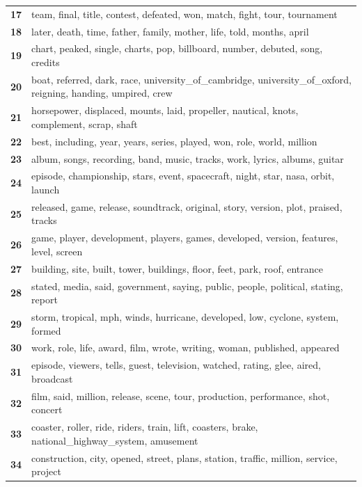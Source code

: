 \begin{table}[htpb]
\begin{tabularx}{\textwidth}{@{}l X@{}}
        \textbf{17} & team, final, title, contest, defeated, won, match, fight, tour, tournament \\
        \textbf{18} & later, death, time, father, family, mother, life, told, months, april \\
        \textbf{19} & chart, peaked, single, charts, pop, billboard, number, debuted, song, credits \\
        \textbf{20} & boat, referred, dark, race, university\_of\_cambridge, university\_of\_oxford, reigning, handing, umpired, crew \\
        \textbf{21} & horsepower, displaced, mounts, laid, propeller, nautical, knots, complement, scrap, shaft \\
        \textbf{22} & best, including, year, years, series, played, won, role, world, million \\
        \textbf{23} & album, songs, recording, band, music, tracks, work, lyrics, albums, guitar \\
        \textbf{24} & episode, championship, stars, event, spacecraft, night, star, nasa, orbit, launch \\
        \textbf{25} & released, game, release, soundtrack, original, story, version, plot, praised, tracks \\
        \textbf{26} & game, player, development, players, games, developed, version, features, level, screen \\
        \textbf{27} & building, site, built, tower, buildings, floor, feet, park, roof, entrance \\
        \textbf{28} & stated, media, said, government, saying, public, people, political, stating, report \\
        \textbf{29} & storm, tropical, mph, winds, hurricane, developed, low, cyclone, system, formed \\
        \textbf{30} & work, role, life, award, film, wrote, writing, woman, published, appeared \\
        \textbf{31} & episode, viewers, tells, guest, television, watched, rating, glee, aired, broadcast \\
        \textbf{32} & film, said, million, release, scene, tour, production, performance, shot, concert \\
        \textbf{33} & coaster, roller, ride, riders, train, lift, coasters, brake, national\_highway\_system, amusement \\
        \textbf{34} & construction, city, opened, street, plans, station, traffic, million, service, project \\

\end{tabularx}
\end{table}
